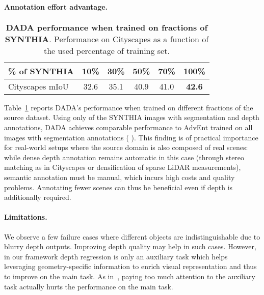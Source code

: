 \documentclass[10pt,twocolumn,letterpaper]{article}
\begin{document}
\paragraph{Annotation effort advantage.}
\begin{table}[t]
	\vspace{-0.2cm}
	\begin{center}
		\setlength{\tabcolsep}{5pt}
		\begin{tabular}{l|ccccc}
			\rule{0pt}{3ex}\% of SYNTHIA &10\%&30\%&50\%&70\%&100\%\\
			\hline
			\rule{0pt}{3ex}Cityscapes mIoU &32.6&35.1&40.9&41.0&\textbf{42.6}
		\end{tabular}
	\end{center}
	\vspace{-0.5cm}
	\caption{\small \textbf{DADA performance when trained on fractions of SYNTHIA}. Performance on Cityscapes as a function of the used percentage of training set.}
	\vspace{-0.4cm}
	\label{tbl:abl_percentage}
\end{table}
Table~\ref{tbl:abl_percentage} reports DADA's performance when trained on different fractions of the source dataset. Using only  of the SYNTHIA images with segmentation and depth annotations, DADA achieves comparable performance to AdvEnt trained on all images with segmentation annotations ( \vs ). This finding is of practical importance for real-world setups where the source domain is also composed of real scenes: while dense depth annotation remains automatic in this case (through stereo matching as in Cityscapes or densification of sparse LiDAR measurements), semantic annotation must be manual, which incurs high costs and quality problems. Annotating fewer scenes can thus be beneficial even if depth is additionally required.

\vspace{-0.3cm}
\paragraph{Limitations.}
We observe a few failure cases where different objects are indistinguishable due to blurry depth outputs.
Improving depth quality may help in such cases.
However, in our framework depth regression is only an auxiliary task which 
helps leveraging geometry-specific information to enrich visual representation and thus to improve on the main task.
As in~\cite{mordan2018revisiting}, paying too much attention to the auxiliary task actually hurts the performance on the main task. 	
\end{document}
